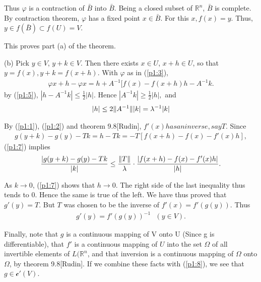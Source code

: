 \documentclass[a4paper,12pt]{article}
\makeatletter
\renewenvironment{proof}[1][\proofname] {\par\pushQED{\qed}\normalfont\topsep6\p@\@plus6\p@\relax\trivlist\item[\hskip\labelsep\bfseries#1\@addpunct{.}]\ignorespaces}{\popQED\endtrivlist\@endpefalse}
\theoremstyle{break}
\DeclarePairedDelimiter{\norm}{\lVert}{\rVert}
\makeatother
\begin{document}
\begin{proof} [Proof of theorem \ref{thm:InverseFunctionTheorem}]
    Thus $\varphi$ is a contraction of $\bar{B}$ into $\bar{B}$. Being a closed subset of $\mathbb{R}^n$, $\bar{B}$ is complete. By contraction theorem, $\varphi$ has a fixed point $x\in \bar{B}$. For this $x, f(x)=y$. Thus, $y\in f(\bar{B})\subset f(U)=V$.

    This proves part (a) of the theorem.
    
    (b) Pick $y\in V$, $y+k\in V$. Then there exists $x\in U$, $x+h \in U$, so that $y=f(x),y+k=f(x+h)$. With $\varphi$ as in (\ref{p1:3}),
    \begin{align}
        \varphi{x+h}-\varphi{x}=h+A^{-1}[f(x)-f(x+h)h-A^{-1}k.
        \label{p1:6}
    \end{align}
    by (\ref{p1:5}), $|h-A^{-1}k|\leq\frac{1}{2}|h|$. Hence $|A^{-1}k|\geq\frac{1}{2}|h|,$ and
    \begin{align}
        |h|\leq2\norm{A^{-1}}|k|=\lambda^{-1}|k|
        \label{p1:7}
    \end{align}

    By (\ref{p1:1}), (\ref{p1:2}) and theorem 9.8[Rudin], $f'(x) has an inverse, say T.$ Since 
    \begin{align*}
        g(y+k)-g(y)-Tk=h-Tk=-T[f(x+h)-f(x)-f'(x)h],
    \end{align*}
    (\ref{p1:7}) implies
    \begin{align*}
        \frac{|g(y+k)-g(y)-Tk}{|k|}\leq\frac{\norm{T}}{\lambda} \cdot\frac{|f(x+h)-f(x)-f'(x)h|}{|h|}.
    \end{align*}
    
    As $k\to0$, (\ref{p1:7}) shows that $h\to0$. The right side of the last inequality thus tends to 0. Hence the same is true of the left. We have thus proved that $g'(y)=T$. But $T$ was chosen to be the inverse of $f'(x)=f'(g(y))$. Thus
    \begin{align}
        g'(y)={f'(g(y))}^{-1}\ \ \ (y\in V).
        \label{p1:8}
    \end{align}
     
    Finally, note that $g$ is a continuous mapping of V onto U (Since g is differentiable), that $f'$ is a continuous mapping of $U$ into the set $\Omega$ of all invertible elements of $L(\mathbb{R}^n$, and that inversion is a continuous mapping of $\Omega$ onto $\Omega$, by theorem 9.8[Rudin]. If we combine these facts with (\ref{p1:8}), we see that $g\in\mathcal{c}'(V)$.

\end{proof}
\end{document}
